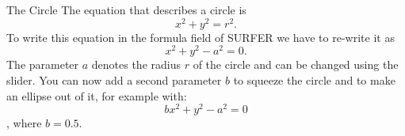 \begin{surferPage}[Circle]{The Circle}
The equation that describes a circle is
\[x^2+y^2=r^2.\]
To write this equation in the formula field of SURFER we have to re-write it as
\[x^2+y^2-a^2=0.\]
The parameter $a$ denotes the radius $r$ of the circle and can be changed using the slider. You can now add a second parameter $b$ to squeeze the circle and to make an ellipse out of it, for example with:
\[bx^2+y^2-a^2=0\], where $b=0.5$.
\end{surferPage}
